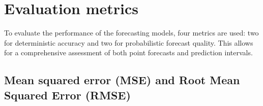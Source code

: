 \documentclass[class=scrbook, crop=false]{standalone}
\begin{document}
 
 








\section{Evaluation metrics}
\label{Section:Evaluation_Metrics}

To evaluate the performance of the forecasting models, four metrics are used: two for deterministic accuracy and two for probabilistic forecast quality. This allows for a comprehensive assessment of both point forecasts and prediction intervals.

\subsection{Mean squared error (MSE) and Root Mean Squared Error (RMSE)}
\end{document}
